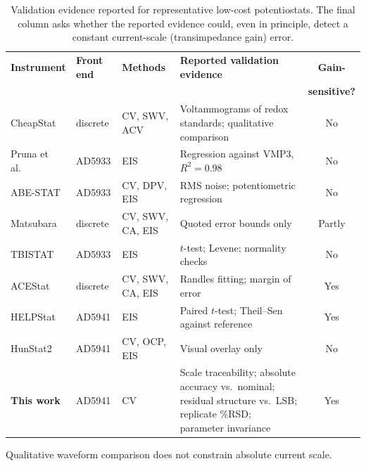 \begin{table}[!t]
\caption{Validation evidence reported for representative low-cost
potentiostats. The final column asks whether the reported evidence could, even
in principle, detect a constant current-scale (transimpedance gain) error.}
\label{tab:comparison}
\centering
\footnotesize
\setlength{\tabcolsep}{4pt}
\begin{threeparttable}
\begin{tabular}{@{}l l >{\raggedright\arraybackslash}p{2.2cm} >{\raggedright\arraybackslash}p{4.3cm} c@{}}
\toprule
\textbf{Instrument} & \textbf{Front end} & \textbf{Methods} &
\textbf{Reported validation evidence} & \textbf{Gain-} \\
 & & & & \textbf{sensitive?} \\
\midrule
CheapStat~\cite{rowe2011cheapstat}      & discrete    & CV, SWV, ACV & Voltammograms of redox standards; qualitative comparison & No\tnote{a} \\
Pruna et al.~\cite{pruna2018low}        & AD5933      & EIS          & Regression against VMP3, $R^{2}=0.98$ & No\tnote{b} \\
ABE-STAT~\cite{jenkins2019abe}          & AD5933      & CV, DPV, EIS & RMS noise; potentiometric regression & No\tnote{b} \\
Matsubara~\cite{matsubara2021small}     & discrete    & CV, SWV, CA, EIS & Quoted error bounds only & Partly\tnote{c} \\
TBISTAT~\cite{burgos2022tbistat}        & AD5933      & EIS          & $t$-test; Levene; normality checks & No\tnote{d} \\
ACEStat~\cite{brown2022acestat}         & discrete    & CV, SWV, CA, EIS & Randles fitting; margin of error & Yes \\
HELPStat~\cite{bautista2025helpstat}    & AD5941      & EIS          & Paired $t$-test; Theil--Sen against reference & Yes\tnote{d} \\
HunStat2~\cite{vamos2025hunstat2}       & AD5941      & CV, OCP, EIS & Visual overlay only & No \\
\textbf{This work}                      & AD5941      & CV\tnote{e}  & Scale traceability; absolute accuracy vs.\ nominal; residual structure vs.\ LSB; replicate \%RSD; parameter invariance & Yes \\
\bottomrule
\end{tabular}
\begin{tablenotes}\footnotesize
\item[a] Qualitative waveform comparison does not constrain absolute current scale.

\end{tablenotes}
\end{threeparttable}
\end{table}
